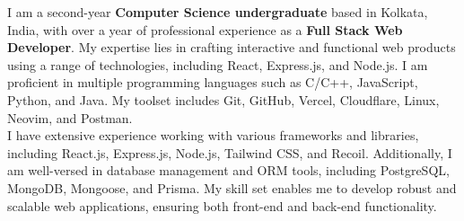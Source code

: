 


I am a second-year \textbf{Computer Science undergraduate} based in Kolkata, India, with over a year of professional experience as a \textbf{Full Stack Web Developer}. My expertise lies in crafting interactive and functional web products using a range of technologies, including React, Express.js, and Node.js. I am proficient in multiple programming languages such as C/C++, JavaScript, Python, and Java. My toolset includes Git, GitHub, Vercel, Cloudflare, Linux, Neovim, and Postman.\\[0.5cm]





I have extensive experience working with various frameworks and libraries, including React.js, Express.js, Node.js, Tailwind CSS, and Recoil. Additionally, I am well-versed in database management and ORM tools, including PostgreSQL, MongoDB, Mongoose, and Prisma. My skill set enables me to develop robust and scalable web applications, ensuring both front-end and back-end functionality.
